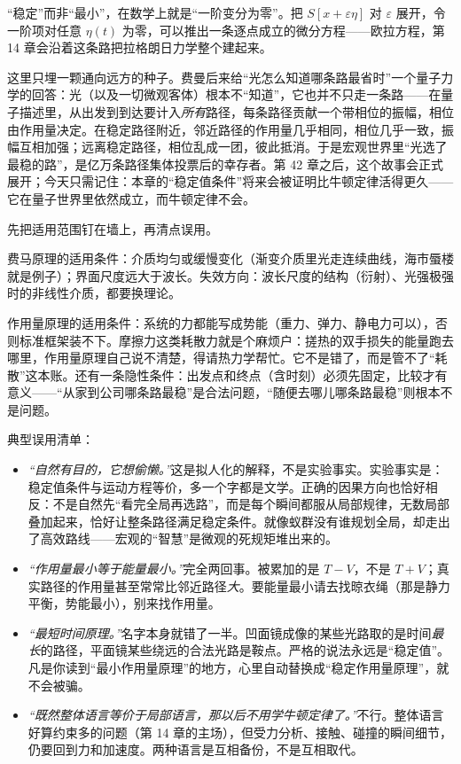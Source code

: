 \begin{challenge}
“稳定”而非“最小”，在数学上就是“一阶变分为零”。把 \(S[x+\varepsilon\eta]\) 对 \(\varepsilon\) 展开，令一阶项对任意 \(\eta(t)\) 为零，可以推出一条逐点成立的微分方程——欧拉方程，第 14 章会沿着这条路把拉格朗日力学整个建起来。

这里只埋一颗通向远方的种子。费曼后来给“光怎么知道哪条路最省时”一个量子力学的回答：光（以及一切微观客体）根本不“知道”，它也并不只走一条路——在量子描述里，从出发到到达要计入\emph{所有}路径，每条路径贡献一个带相位的振幅，相位由作用量决定。在稳定路径附近，邻近路径的作用量几乎相同，相位几乎一致，振幅互相加强；远离稳定路径，相位乱成一团，彼此抵消。于是宏观世界里“光选了最稳的路”，是亿万条路径集体投票后的幸存者。第 42 章之后，这个故事会正式展开；今天只需记住：本章的“稳定值条件”将来会被证明比牛顿定律活得更久——它在量子世界里依然成立，而牛顿定律不会。
\end{challenge}


\begin{mainline}
先把适用范围钉在墙上，再清点误用。

费马原理的适用条件：介质均匀或缓慢变化（渐变介质里光走连续曲线，海市蜃楼就是例子）；界面尺度远大于波长。失效方向：波长尺度的结构（衍射）、光强极强时的非线性介质，都要换理论。

作用量原理的适用条件：系统的力都能写成势能（重力、弹力、静电力可以），否则标准框架装不下。摩擦力这类耗散力就是个麻烦户：搓热的双手损失的能量跑去哪里，作用量原理自己说不清楚，得请热力学帮忙。它不是错了，而是管不了“耗散”这本账。还有一条隐性条件：出发点和终点（含时刻）必须先固定，比较才有意义——“从家到公司哪条路最稳”是合法问题，“随便去哪儿哪条路最稳”则根本不是问题。
\end{mainline}

典型误用清单：

\begin{itemize}[leftmargin=1.8em]
  \item \emph{“自然有目的，它想偷懒。”}这是拟人化的解释，不是实验事实。实验事实是：稳定值条件与运动方程等价，多一个字都是文学。正确的因果方向也恰好相反：不是自然先“看完全局再选路”，而是每个瞬间都服从局部规律，无数局部叠加起来，恰好让整条路径满足稳定条件。就像蚁群没有谁规划全局，却走出了高效路线——宏观的“智慧”是微观的死规矩堆出来的。
  \item \emph{“作用量最小等于能量最小。”}完全两回事。被累加的是 \(T-V\)，不是 \(T+V\)；真实路径的作用量甚至常常比邻近路径\emph{大}。要能量最小请去找晾衣绳（那是静力平衡，势能最小），别来找作用量。
  \item \emph{“最短时间原理。”}名字本身就错了一半。凹面镜成像的某些光路取的是时间\emph{最长}的路径，平面镜某些绕远的合法光路是鞍点。严格的说法永远是“稳定值”。凡是你读到“最小作用量原理”的地方，心里自动替换成“稳定作用量原理”，就不会被骗。
  \item \emph{“既然整体语言等价于局部语言，那以后不用学牛顿定律了。”}不行。整体语言好算约束多的问题（第 14 章的主场），但受力分析、接触、碰撞的瞬间细节，仍要回到力和加速度。两种语言是互相备份，不是互相取代。
\end{itemize}


